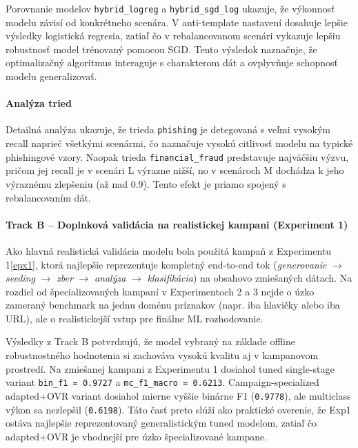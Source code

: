 \documentclass[conference]{IEEEtran}
\begin{document}
Porovnanie modelov \texttt{hybrid\_logreg} a
\texttt{hybrid\_sgd\_log} ukazuje, že výkonnosť modelu závisí
od konkrétneho scenára. V anti-template nastavení dosahuje lepšie
výsledky logistická regresia, zatiaľ čo v rebalancovanom scenári
vykazuje lepšiu robustnosť model trénovaný pomocou SGD.
Tento výsledok naznačuje, že optimalizačný algoritmus interaguje
s charakterom dát a ovplyvňuje schopnosť modelu generalizovať.

\paragraph{Analýza tried}

Detailná analýza ukazuje, že trieda \texttt{phishing}
je detegovaná s veľmi vysokým recall naprieč všetkými scenármi,
čo naznačuje vysokú citlivosť modelu na typické phishingové vzory.
Naopak trieda \texttt{financial\_fraud} predstavuje najväčšiu výzvu,
pričom jej recall je v scenári L výrazne nižší, no v scenároch M
dochádza k jeho výraznému zlepšeniu (až nad 0.9).
Tento efekt je priamo spojený s rebalancovaním dát.

\paragraph{Track B – Doplnková validácia na realistickej kampani (Experiment 1)}

Ako hlavná realistická validácia modelu bola použitá kampaň
z Experimentu 1\ref{epx1}, ktorá najlepšie reprezentuje kompletný
end-to-end tok
(\textit{generovanie} $\rightarrow$ \textit{seeding} $\rightarrow$ \textit{zber}
$\rightarrow$ \textit{analýza} $\rightarrow$ \textit{klasifikácia})
na obsahovo zmiešaných dátach. Na rozdiel od špecializovaných kampaní
v Experimentoch 2 a 3 nejde o úzko zameraný benchmark na jednu doménu
príznakov (napr. iba hlavičky alebo iba URL), ale o realistickejší
vstup pre finálne ML rozhodovanie.

Výsledky z Track B potvrdzujú, že model vybraný na základe
offline robustnostného hodnotenia si zachováva vysokú kvalitu
aj v kampanovom prostredí. Na zmiešanej kampani z Experimentu 1
dosiahol tuned single-stage variant \texttt{bin\_f1 = 0.9727}
a \texttt{mc\_f1\_macro = 0.6213}. Campaign-specialized adapted+OVR
variant dosiahol mierne vyššie binárne F1 (\texttt{0.9778}), ale
multiclass výkon sa nezlepšil (\texttt{0.6198}). Táto časť preto
slúži ako praktické overenie, že Exp1 ostáva najlepšie reprezentovaný
generalistickým tuned modelom, zatiaľ čo adapted+OVR je vhodnejší
pre úzko špecializované kampane.
\end{document}
